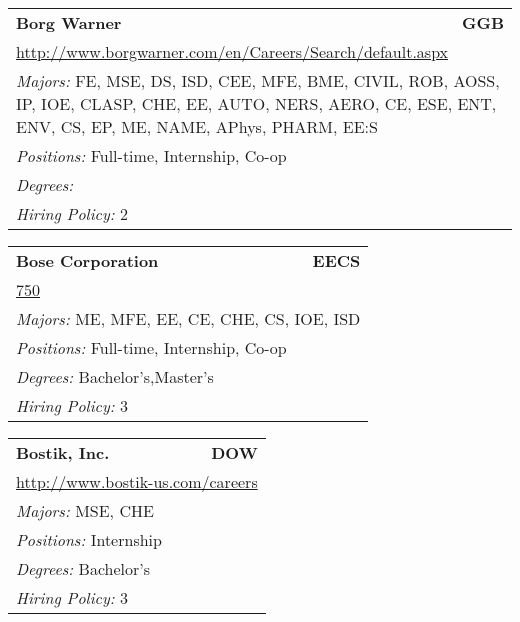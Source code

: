 \documentclass[twoside]{article}
\begin{document}
\begin{center}
\begin{multicols}{3}
\begin{FlushLeft}
\begin{minipage}{.9\columnwidth}\begin{tabularx}{.95\columnwidth}{Xr}
                 {\Large\bf Borg Warner} & {\Large\bf GGB}\\
    \multicolumn{2}{p{.95\columnwidth}}{\url{http://www.borgwarner.com/en/Careers/Search/default.aspx}}\\
    \multicolumn{2}{p{.95\columnwidth}}{\emph{Majors:} FE, MSE, DS, ISD, CEE, MFE, BME, CIVIL, ROB, AOSS, IP, IOE, CLASP, CHE, EE, AUTO, NERS, AERO, CE, ESE, ENT, ENV, CS, EP, ME, NAME, APhys, PHARM, EE:S}\\
    \multicolumn{2}{p{.95\columnwidth}}{\emph{Positions:} Full-time, Internship, Co-op}\\
    \multicolumn{2}{p{.95\columnwidth}}{\emph{Degrees:} }\\
    \multicolumn{2}{p{.95\columnwidth}}{\emph{Hiring Policy:} 2}\\
    \end{tabularx}
    
\end{minipage}
 
\begin{minipage}{.9\columnwidth}\begin{tabularx}{.95\columnwidth}{Xr}
                 {\Large\bf Bose Corporation} & {\Large\bf EECS}\\
    \multicolumn{2}{p{.95\columnwidth}}{\url{750}}\\
    \multicolumn{2}{p{.95\columnwidth}}{\emph{Majors:} ME, MFE, EE, CE, CHE, CS, IOE, ISD}\\
    \multicolumn{2}{p{.95\columnwidth}}{\emph{Positions:} Full-time, Internship, Co-op}\\
    \multicolumn{2}{p{.95\columnwidth}}{\emph{Degrees:} Bachelor's,Master's}\\
    \multicolumn{2}{p{.95\columnwidth}}{\emph{Hiring Policy:} 3}\\
    \end{tabularx}
    
\end{minipage}
 
\begin{minipage}{.9\columnwidth}\begin{tabularx}{.95\columnwidth}{Xr}
                 {\Large\bf Bostik, Inc.} & {\Large\bf DOW}\\
    \multicolumn{2}{p{.95\columnwidth}}{\url{http://www.bostik-us.com/careers}}\\
    \multicolumn{2}{p{.95\columnwidth}}{\emph{Majors:} MSE, CHE}\\
    \multicolumn{2}{p{.95\columnwidth}}{\emph{Positions:} Internship}\\
    \multicolumn{2}{p{.95\columnwidth}}{\emph{Degrees:} Bachelor's}\\
    \multicolumn{2}{p{.95\columnwidth}}{\emph{Hiring Policy:} 3}\\
    \end{tabularx}
    

\end{minipage}
\end{FlushLeft}
\end{multicols}
\end{center}
\end{document}
